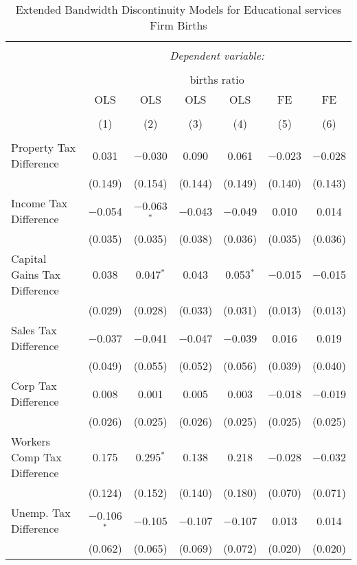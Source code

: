 
\begin{table}[!htbp] \centering 
  \caption{Extended Bandwidth Discontinuity Models for  Educational services Firm Births} 
  \label{61rd} 
\begin{tabular}{@{\extracolsep{5pt}}lcccccc} 
\\[-1.8ex]\hline 
\hline \\[-1.8ex] 
 & \multicolumn{6}{c}{\textit{Dependent variable:}} \\ 
\cline{2-7} 
\\[-1.8ex] & \multicolumn{6}{c}{births ratio} \\ 
 & OLS & OLS & OLS & OLS & FE & FE \\ 
\\[-1.8ex] & (1) & (2) & (3) & (4) & (5) & (6)\\ 
\hline \\[-1.8ex] 
 Property Tax Difference & 0.031 & $-$0.030 & 0.090 & 0.061 & $-$0.023 & $-$0.028 \\ 
  & (0.149) & (0.154) & (0.144) & (0.149) & (0.140) & (0.143) \\ 
  Income Tax Difference & $-$0.054 & $-$0.063$^{*}$ & $-$0.043 & $-$0.049 & 0.010 & 0.014 \\ 
  & (0.035) & (0.035) & (0.038) & (0.036) & (0.035) & (0.036) \\ 
  Capital Gains Tax Difference & 0.038 & 0.047$^{*}$ & 0.043 & 0.053$^{*}$ & $-$0.015 & $-$0.015 \\ 
  & (0.029) & (0.028) & (0.033) & (0.031) & (0.013) & (0.013) \\ 
  Sales Tax Difference & $-$0.037 & $-$0.041 & $-$0.047 & $-$0.039 & 0.016 & 0.019 \\ 
  & (0.049) & (0.055) & (0.052) & (0.056) & (0.039) & (0.040) \\ 
  Corp Tax Difference & 0.008 & 0.001 & 0.005 & 0.003 & $-$0.018 & $-$0.019 \\ 
  & (0.026) & (0.025) & (0.026) & (0.025) & (0.025) & (0.025) \\ 
  Workers Comp Tax Difference & 0.175 & 0.295$^{*}$ & 0.138 & 0.218 & $-$0.028 & $-$0.032 \\ 
  & (0.124) & (0.152) & (0.140) & (0.180) & (0.070) & (0.071) \\ 
  Unemp. Tax Difference & $-$0.106$^{*}$ & $-$0.105 & $-$0.107 & $-$0.107 & 0.013 & 0.014 \\ 
  & (0.062) & (0.065) & (0.069) & (0.072) & (0.020) & (0.020) \\ 

\end{tabular}
\end{table}
